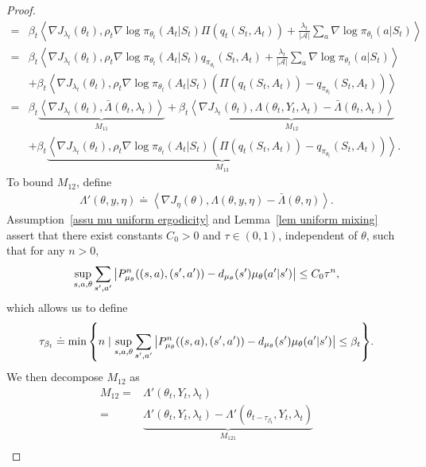 \documentclass[twoside,11pt]{article}
\newcommand{\fA}{\mathcal{A}}
\newcommand{\na}{{|\fA|}}
\newcommand{\indot}[2]{{\left<#1, #2\right>}}
\numberwithin{assucounter}{section}
\begin{document}
\begin{proof}
\begin{align}
    =&\beta_t \indot{\nabla J_{\lambda_t}(\theta_t)}{ \rho_t  \nabla \log \pi_{\theta_t}(A_t | S_t) \Pi (q_t(S_t, A_t)) + \frac{\lambda_t}{\na} \sum_a \nabla \log \pi_{\theta_t}(a|S_t) } \\
    =&\beta_t \indot{\nabla J_{\lambda_t}(\theta_t)}{ \rho_t  \nabla \log \pi_{\theta_t}(A_t | S_t) q_{\pi_{\theta_t}}(S_t, A_t) + \frac{\lambda_t}{\na} \sum_a \nabla \log \pi_{\theta_t}(a|S_t) } \\
    &+ \beta_t \indot{\nabla J_{\lambda_t}(\theta_t)}{ \rho_t  \nabla \log \pi_{\theta_t}(A_t | S_t) \left(\Pi\left(q_t(S_t, A_t)\right) - q_{\pi_{\theta_t}}(S_t, A_t) \right) } \\
    =&\beta_t \underbrace{\indot{\nabla J_{\lambda_t}(\theta_t)}{\bar \Lambda(\theta_t, \lambda_t)}}_{M_{11}} + \beta_t \underbrace{\indot{\nabla J_{\lambda_t}(\theta_t)}{\Lambda(\theta_t, Y_t, \lambda_t) - \bar \Lambda(\theta_t, \lambda_t)}}_{M_{12}} \\
    &+ \beta_t \underbrace{\indot{\nabla J_{\lambda_t}(\theta_t)}{ \rho_t  \nabla \log \pi_{\theta_t}(A_t | S_t) \left(\Pi\left(q_t(S_t, A_t)\right) - q_{\pi_{\theta_t}}(S_t, A_t) \right) }}_{M_{13}}.
  \end{align}
  To bound $M_{12}$,
  define 
  \begin{align}
    \label{eq actor helper function 2}
    \Lambda'(\theta, y, \eta) \doteq \indot{\nabla J_{\eta}(\theta)}{\Lambda(\theta, y, \eta) - \bar \Lambda(\theta, \eta)}.
  \end{align}
  Assumption~\ref{assu mu uniform ergodicity} and Lemma~\ref{lem uniform mixing} assert that 
  there exist constants $C_0 > 0$ and $\tau \in (0, 1)$,
  independent of $\theta$,
  such that for any $n > 0$,
  \begin{align}
    \sup_{s, a, \theta}\sum_{s', a'} \abs{P_{\mu_\theta}^n((s, a), (s', a')) - d_{\mu_\theta}(s')\mu_{\theta}(a'|s')} \leq C_0 \tau^n,
  \end{align} 
  which allows us to define 
  \begin{align}
    \label{eq definition of beta t}
    \tau_{\beta_t} \doteq \min\qty{n \mid \sup_{s, a, \theta}\sum_{s', a'} \abs{P_{\mu_\theta}^n((s, a), (s', a')) - d_{\mu_\theta}(s')\mu_{\theta}(a'|s')}  \leq \beta_t}.
  \end{align}
  We then decompose $M_{12}$ as
  \begin{align}
    M_{12} =& \Lambda'(\theta_t, Y_t, \lambda_t) \\
    =& \underbrace{\Lambda'(\theta_t, Y_t, \lambda_t) - \Lambda'(\theta_{t-\tau_{\beta_t}}, Y_t, \lambda_t)}_{M_{121}} \\

\end{align}
\end{proof}
\end{document}
